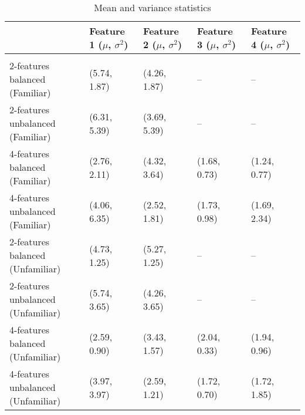 
\begin{table*}[t]
    \caption{Mean and variance statistics}\label{table:mv-stats}
    \begin{center}
        \begin{tabular}{lllll}
         & Feature 1 ($\mu$, $\sigma^2$) & Feature 2 ($\mu$, $\sigma^2$) & Feature 3 ($\mu$, $\sigma^2$) & Feature 4 ($\mu$, $\sigma^2$)\\
        \hline \\[-4.8pt]
        2-features balanced (Familiar) & (5.74, 1.87) & (4.26, 1.87) & -- & -- \\
        2-features unbalanced (Familiar) & (6.31, 5.39) & (3.69, 5.39) & -- & -- \\
        4-features balanced (Familiar) & (2.76, 2.11) & (4.32, 3.64) & (1.68, 0.73) & (1.24, 0.77) \\
        4-features unbalanced (Familiar) & (4.06, 6.35) & (2.52, 1.81) & (1.73, 0.98) & (1.69, 2.34) \\
        2-features balanced (Unfamiliar) & (4.73, 1.25) & (5.27, 1.25) & -- & -- \\
        2-features unbalanced (Unfamiliar) & (5.74, 3.65) & (4.26, 3.65) & -- & -- \\
        4-features balanced (Unfamiliar) & (2.59, 0.90) & (3.43, 1.57) & (2.04, 0.33) & (1.94, 0.96) \\
        4-features unbalanced (Unfamiliar) & (3.97, 3.97) & (2.59, 1.21) & (1.72, 0.70) & (1.72, 1.85) 
        \end{tabular}
    \end{center}
\end{table*}


